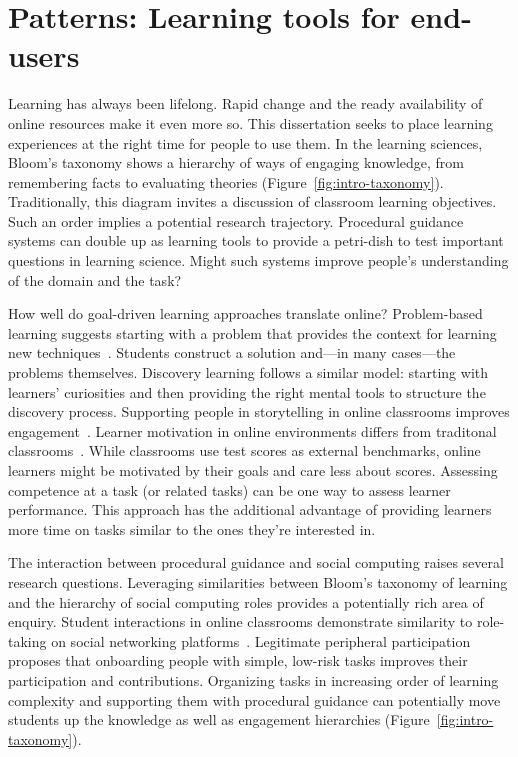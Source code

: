 \section{Patterns: Learning tools for end-users} 
Learning has always been lifelong. Rapid change and the ready availability of online resources make it even more so. This dissertation seeks to place learning experiences at the right time for people to use them. In the learning sciences, Bloom’s taxonomy shows a hierarchy of ways of engaging knowledge, from remembering facts to evaluating theories (Figure~\ref{fig:intro-taxonomy}). Traditionally, this diagram invites a discussion of classroom learning objectives. Such an order implies a potential research trajectory. Procedural guidance systems can double up as learning tools to provide a petri-dish to test important questions in learning science. Might such systems improve people's understanding of the domain and the task?

How well do goal-driven learning approaches translate online? Problem-based learning suggests starting with a problem that provides the context for learning new techniques~\cite{johnson2009breaking}. Students construct a solution and---in many cases---the problems themselves. Discovery learning follows a similar model: starting with learners' curiosities and then providing the right mental tools to structure the discovery process. Supporting people in storytelling in online classrooms improves engagement~\cite{Pandey2015}. Learner motivation in online environments differs from traditonal classrooms~\cite{kizilcec2015motivation}. While classrooms use test scores as external benchmarks, online learners might be motivated by their goals and care less about scores. Assessing competence at a task (or related tasks) can be one way to assess learner performance. This approach has the additional advantage of providing learners more time on tasks similar to the ones they're interested in.

The interaction between procedural guidance and social computing raises several research questions. Leveraging similarities between Bloom’s taxonomy of learning and the hierarchy of social computing roles provides a potentially rich area of enquiry. Student interactions in online classrooms demonstrate similarity to role-taking on social networking platforms~\cite{kizilcec2013deconstructing}. Legitimate peripheral participation~\cite{Bryant2005} proposes that onboarding people with simple, low-risk tasks improves their participation and contributions. Organizing tasks in increasing order of learning complexity and supporting them with procedural guidance can potentially move students up the knowledge as well as engagement hierarchies (Figure~\ref{fig:intro-taxonomy}).

